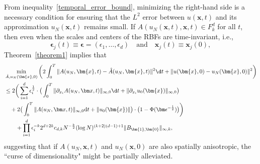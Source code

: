 From inequality~\eqref{temporal_error_bound}, minimizing the right-hand side is a necessary condition for ensuring that the $L^2$ error between $u(\bm{x},t)$ and its approximation $u_N(\bm{x},t)$ remains small. If $A\!\left(u_N(\bm{x},t), \bm{x}, t\right) \in F_k^d$ for all $t$, then even when the scales and centers of the RBFs are time-invariant, i.e.,
\[
\bm{\epsilon}_j(t) \equiv \bm{\epsilon}=(\epsilon_1,\ldots,\epsilon_d)
\quad \text{and} \quad
\bm{x}_j(t) \equiv \bm{x}_j(0),
\]
Theorem~\ref{theorem1} implies that
\begin{equation}
\begin{aligned}
        &\min_{\hat{A}, u_N(\bm{x}, 0)} \bigg(2 \int_0^T  \|A(u_N, \bm{x}, t)-\hat{A}(u_N, \bm{x}, t)\|^2\d t + \|u(\bm{x}, 0) - u_N(\bm{x}, 0)\|^2\bigg) \\
 & \leq 2 \bigg(\sum_{i=1}^d\epsilon_i^{\frac{1}{2}}\cdot \big(\int_0^T\|\partial_{x_i}A(u_N, \bm x, t)\|_{\infty, 0}\d t + \|\partial_{x_i}u_0(\bm{x})\|_{\infty, 0}\big) \\
 &\quad+ 2\big(\int_0^T\|A(u_N, \bm x, t)\|_{\infty, 0}\text{d}t + \|u_0(\bm{x})\|\big)\cdot\big(1-\Phi(\bm\epsilon^{-\frac{1}{2}})\big)\bigg) \\
    &\quad\quad+ \prod_{i=1}^d\epsilon_i^{-k}2^{d+2k}c_{d, k}N^{-\frac{k}{2}}(\log N)^{(k+2)(d-1)+1}\|B_{\bm{1}, \bm{0}}\|_{\infty, k},
\end{aligned}
\label{time_error}
\end{equation}
suggesting that if $A(u_N, \bm{x}, t)$ and $u_N(\bm{x}, 0)$ are also spatially anisotropic, the ``curse of dimensionality" might be partially alleviated. 
 

